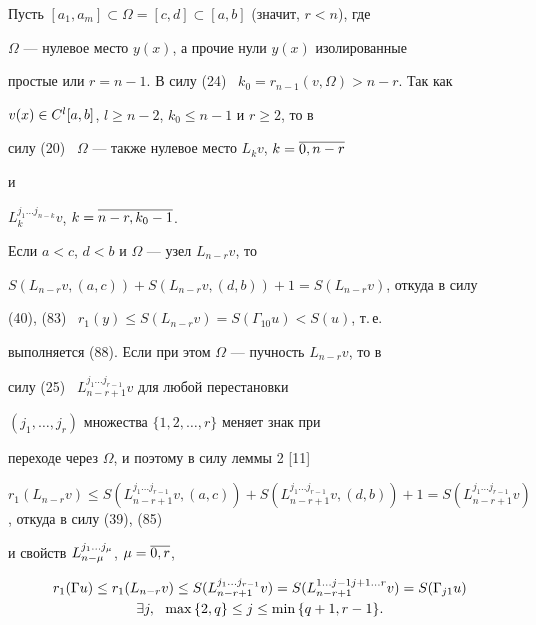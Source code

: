 \begin{pf}


Пусть $[a_1,a_m]\subset\Omega=[c,d]\subset[a,b]$ (значит, $r<n$), где


$\Omega$ --- нулевое место $y(x)$, а прочие нули $y(x)$ изолированные


простые или $r=n-1$. В силу (24) \ $k_0=r_{n-1}(v,\Omega)>n-r$. Так как


$v(x)\in C^l[a,b]$, $l\ge n-2$, $k_0\le n-1$ и $r\ge 2$, то в


силу (20) \ $\Omega$ --- также нулевое место $L_kv$, $k=\overline{0,n-r}$


и


$L^{j_1\dotsc j_{n-k}}_k v$, $k=\overline{n-r, k_0-1}$.





Если $a<c$, $d<b$ и $\Omega$ --- узел $L_{n-r}v$, то


$S(L_{n-r}v,(a,c))+S(L_{n-r}v,(d,b))+1=


S(L_{n-r}v)$, откуда в силу


(40), (83) \ $r_1(y)\le S(L_{n-r}v)=S(\Gamma_{10}u)<S(u)$, т.\,е.


выполняется (88). Если при этом $\Omega$ --- пучность $L_{n-r}v$, то в


силу (25) \ $L^{j_1\dotsc j_{r-1}}_{n-r+1}v$ для любой перестановки


$(j_1,\dotsc,j_r)$ множества $\{1,2,\dotsc,r\}$ меняет знак при


переходе через $\Omega$, и поэтому в силу леммы 2 [11]


$r_1(L_{n-r}v)\le S(L^{j_1\dotsc j_{r-1}}_{n-r+1}v,(a,c))+


S(L^{j_1\dotsc j_{r-1}}_{n-r+1}v,(d,b))+1=


S(L^{j_1\dotsc j_{r-1}}_{n-r+1}v)$, откуда в силу (39), (85)


и свойств ${L}^{j_1\dotsc j_\mu}_{n-\mu}$, $\mu=\overline{0,r}$,


\begin{gather}


r_1(\Gamma u)\le r_1(L_{n-r}v)\le


S(L^{j_1\dotsc j_{r-1}}_{n-r+1}v)=


S(L^{1\dotsc j-1j+1\dotsc r}_{n-r+1}v)=


S(\Gamma_{j1} u)\\


%


\exists j,\ \ \max{\{2,q\}}\le j\le \min{\{q+1,r-1\}}.\notag



\end{gather}
\end{pf}
